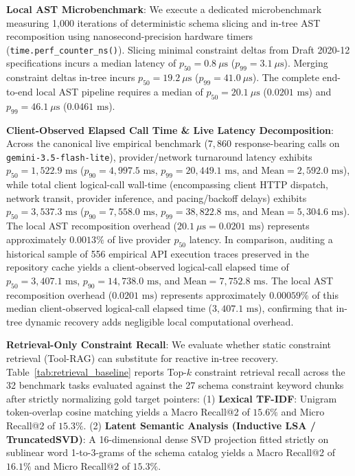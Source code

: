 \noindent\textbf{Local AST Microbenchmark}: We execute a dedicated microbenchmark measuring 1,000 iterations of deterministic schema slicing and in-tree AST recomposition using nanosecond-precision hardware timers (\texttt{time.perf\_counter\_ns()}). Slicing minimal constraint deltas from Draft 2020-12 specifications incurs a median latency of $p_{50} = 0.8\ \mu\text{s}$ ($p_{99} = 3.1\ \mu\text{s}$). Merging constraint deltas in-tree incurs $p_{50} = 19.2\ \mu\text{s}$ ($p_{99} = 41.0\ \mu\text{s}$). The complete end-to-end local AST pipeline requires a median of $p_{50} = 20.1\ \mu\text{s}$ ($0.0201\text{ ms}$) and $p_{99} = 46.1\ \mu\text{s}$ ($0.0461\text{ ms}$).

\noindent\textbf{Client-Observed Elapsed Call Time \& Live Latency Decomposition}: Across the canonical live empirical benchmark ($7,860$ response-bearing calls on \texttt{gemini-3.5-flash-lite}), provider/network turnaround latency exhibits $p_{50} = 1,522.9\text{ ms}$ ($p_{90} = 4,997.5\text{ ms}$, $p_{99} = 20,449.1\text{ ms}$, and $\text{Mean} = 2,592.0\text{ ms}$), while total client logical-call wall-time (encompassing client HTTP dispatch, network transit, provider inference, and pacing/backoff delays) exhibits $p_{50} = 3,537.3\text{ ms}$ ($p_{90} = 7,558.0\text{ ms}$, $p_{99} = 38,822.8\text{ ms}$, and $\text{Mean} = 5,304.6\text{ ms}$). The local AST recomposition overhead ($20.1\ \mu\text{s} = 0.0201\text{ ms}$) represents approximately $0.0013\%$ of live provider $p_{50}$ latency. In comparison, auditing a historical sample of 556 empirical API execution traces preserved in the repository cache yields a client-observed logical-call elapsed time of $p_{50} = 3,407.1\text{ ms}$, $p_{90} = 14,738.0\text{ ms}$, and $\text{Mean} = 7,752.8\text{ ms}$. The local AST recomposition overhead ($0.0201\text{ ms}$) represents approximately $\mathbf{0.00059\%}$ of this median client-observed logical-call elapsed time ($3,407.1\text{ ms}$), confirming that in-tree dynamic recovery adds negligible local computational overhead.

\noindent\textbf{Retrieval-Only Constraint Recall}: We evaluate whether static constraint retrieval (Tool-RAG) can substitute for reactive in-tree recovery. Table~\ref{tab:retrieval_baseline} reports Top-$k$ constraint retrieval recall across the 32 benchmark tasks evaluated against the 27 schema constraint keyword chunks after strictly normalizing gold target pointers:
(1) \textbf{Lexical TF-IDF}: Unigram token-overlap cosine matching yields a Macro Recall@2 of $15.6\%$ and Micro Recall@2 of $15.3\%$.
(2) \textbf{Latent Semantic Analysis (Inductive LSA / TruncatedSVD)}: A 16-dimensional dense SVD projection fitted strictly on sublinear word 1-to-3-grams of the schema catalog yields a Macro Recall@2 of $16.1\%$ and Micro Recall@2 of $15.3\%$.

